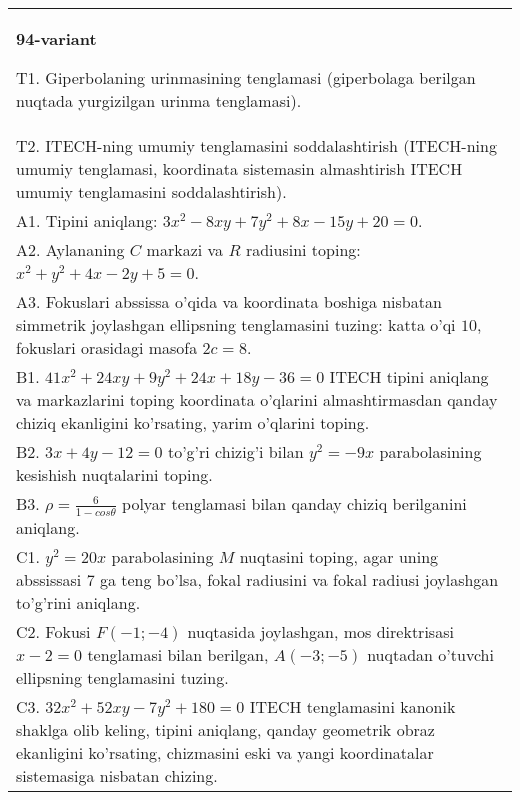 \documentclass{article}
\begin{document}
\begin{tabular}{m{17cm}}
\textbf{94-variant}
\newline

T1. Giperbolaning urinmasining tenglamasi (giperbolaga berilgan nuqtada yurgizilgan urinma tenglamasi).\\

T2. ITECH-ning umumiy tenglamasini soddalashtirish (ITECH-ning umumiy tenglamasi, koordinata sistemasin almashtirish ITECH umumiy tenglamasini soddalashtirish).\\

A1. Tipini aniqlang: $3x^{2}-8xy+7y^{2}+8x-15y+20=0$.\\

A2. Aylananing $C$ markazi va $R$ radiusini toping: $x^2+y^2+4x-2y+5=0$.\\

A3. Fokuslari abssissa o'qida va koordinata boshiga nisbatan simmetrik joylashgan ellipsning tenglamasini tuzing: katta o'qi $10$, fokuslari orasidagi masofa $2c=8$.\\

B1. $41x^{2} + 24xy + 9y^{2} + 24x + 18y - 36 = 0$ ITECH tipini aniqlang va markazlarini toping koordinata o'qlarini almashtirmasdan qanday chiziq ekanligini ko'rsating, yarim o'qlarini toping.  \\

B2. $3x + 4y - 12 = 0$ to'g'ri chizig'i bilan $y^{2} = - 9x$ parabolasining kesishish nuqtalarini toping.  \\

B3. $\rho = \frac{6}{1 - cos\theta}$ polyar tenglamasi bilan qanday chiziq berilganini aniqlang.  \\

C1. $y^{2} = 20x$ parabolasining $M$ nuqtasini toping, agar uning abssissasi 7 ga teng bo'lsa, fokal radiusini va fokal radiusi joylashgan to'g'rini aniqlang.\\

C2. Fokusi $F( - 1; - 4)$ nuqtasida joylashgan, mos direktrisasi $x - 2 = 0$ tenglamasi bilan berilgan, $A( - 3; - 5)$ nuqtadan o'tuvchi ellipsning tenglamasini tuzing.  \\

C3. $32x^{2} + 52xy - 7y^{2} + 180 = 0$ ITECH tenglamasini kanonik shaklga olib keling, tipini aniqlang, qanday geometrik obraz ekanligini ko'rsating, chizmasini eski va yangi koordinatalar sistemasiga nisbatan chizing.  \\

\end{tabular}
\vspace{1cm}
\end{document}
